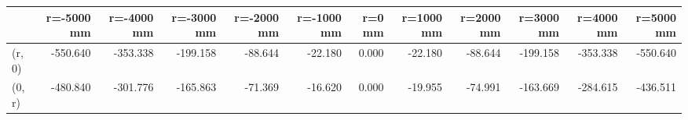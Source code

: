 \documentclass[convert={convertexe={magick.exe}}]{standalone}
\begin{document}
\begin{tabular}{lrrrrrrrrrrr}
\toprule
{} &  r=-5000 mm &  r=-4000 mm &  r=-3000 mm &  r=-2000 mm &  r=-1000 mm &  r=0 mm &  r=1000 mm &  r=2000 mm &  r=3000 mm &  r=4000 mm &  r=5000 mm \\
\midrule
(r, 0) &    -550.640 &    -353.338 &    -199.158 &     -88.644 &     -22.180 &   0.000 &    -22.180 &    -88.644 &   -199.158 &   -353.338 &   -550.640 \\
(0, r) &    -480.840 &    -301.776 &    -165.863 &     -71.369 &     -16.620 &   0.000 &    -19.955 &    -74.991 &   -163.669 &   -284.615 &   -436.511 \\
\bottomrule
\end{tabular}
\end{document}
